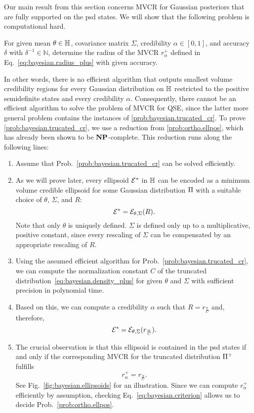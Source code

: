 Our main result from this section concerns MVCR for Gaussian posteriors that are fully supported on the psd states.
We will show that the following problem is computational hard.
\begin{problem}\label{prob:bayesian.trucated_cr}
  For given mean $\theta \in \mathbb{H}$, covariance matrix $\Sigma$, credibility $\alpha \in [0,1]$, and accuracy $\delta$ with $\delta^{-1} \in \mathbb{N}$, determine the radius of the MVCR $r^+_{\alpha}$ defined in Eq.~\eqref{eq:bayesian.radius_plus} with given accuracy.
\end{problem}
In other words, there is no efficient algorithm that outputs smallest volume credibility regions for every Gaussian distribution on $\mathbb{H}$ restricted to the positive semidefinite states and every credibility $\alpha$.
Consequently, there cannot be an efficient algorithm to solve the problem of MVCR for QSE, since the latter more general problem contains the instances of \cref{prob:bayesian.trucated_cr}.
To prove \cref{prob:bayesian.trucated_cr}, we use a reduction from \cref{prob:ortho.ellpos}, which has already been shown to be $\mathbf{NP}$-complete.
This reduction runs along the following lines:
\begin{enumerate}
  \item Assume that Prob.~\ref{prob:bayesian.trucated_cr} can be solved efficiently.

  \item As we will prove later, every ellipsoid $\mathcal{E}^*$ in $\mathbb{H}$ can be encoded as a minimum volume credible ellipsoid for some Gaussian distribution $\Pi$ with a suitable choice of $\theta$, $\Sigma$, and $R$:
  \[
    \mathcal{E}^* = \mathcal{E}_{\theta,\Sigma}(R).
  \]
  Note that only $\theta$ is uniquely defined.
  $\Sigma$ is defined only up to a multiplicative, positive constant, since every rescaling of $\Sigma$ can be compensated by an appropriate rescaling of $R$.

  \item  Using the assumed efficient algorithm for Prob.~\ref{prob:bayesian.trucated_cr}, we can compute the normalization constant $C$ of the truncated distribution~\eqref{eq:bayesian.density_plus} for given $\theta$ and $\Sigma$ with sufficient precision in polynomial time.

  \item Based on this, we can compute a credibility $\alpha$ such that $R = r_\frac{\alpha}{C}$ and, therefore,
  \[
    \mathcal{E}^* = \mathcal{E}_{\theta,\Sigma}(r_\frac{\alpha}{C}).
  \]

  \item The crucial observation is that this ellipsoid is contained in the psd states if and only if the corresponding MVCR for the truncated distribution $\Pi^+$ fulfills
  \[
    \label{eq:bayesian.criterion}
    r^+_{\alpha} = r_\frac{\alpha}{C}.
  \]
  See Fig.~\ref{fig:bayesian.ellipsoids} for an illustration.
  Since we can compute $r^+_{\alpha}$ efficiently by assumption, checking Eq.~\eqref{eq:bayesian.criterion} allows us to decide Prob.~\ref{prob:ortho.ellpos}.
\end{enumerate}

